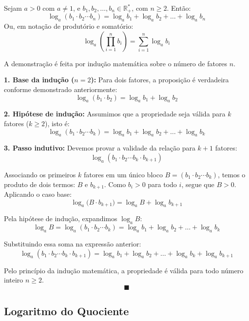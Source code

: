 \documentclass[12pt,a4paper]{report}
\begin{document}
	\newpage
	
	\begin{destaque}
		Sejam $a > 0$ com $a \neq 1$, e $b_1, b_2, \dots, b_n \in \mathbb{R}^*_+$, com $n \geqslant 2$. Então:
		$$\log_a (b_1 \cdot b_2 \dotsm b_n) = \log_a b_1 + \log_a b_2 + \dots + \log_a b_n$$
		Ou, em notação de produtório e somatório:
		$$\log_a \left(\prod_{i=1}^n b_i\right) = \sum_{i=1}^n \log_a b_i$$
	\end{destaque}
	
	\begin{destaque}
		A demonstração é feita por indução matemática sobre o número de fatores $n$.
		
		\textbf{1. Base da indução ($n = 2$):}  
		Para dois fatores, a proposição é verdadeira conforme demonstrado anteriormente:
		$$\log_a (b_1 \cdot b_2) = \log_a b_1 + \log_a b_2$$
		
		\textbf{2. Hipótese de indução:}  
		Assumimos que a propriedade seja válida para $k$ fatores ($k \geqslant 2$), isto é:
		$$\log_a (b_1 \cdot b_2 \dotsm b_k) = \log_a b_1 + \log_a b_2 + \dots + \log_a b_k$$
		
		\textbf{3. Passo indutivo:}  
		Devemos provar a validade da relação para $k + 1$ fatores:
		$$\log_a (b_1 \cdot b_2 \dotsm b_k \cdot b_{k+1})$$
		
		Associando os primeiros $k$ fatores em um único bloco $B = (b_1 \cdot b_2 \dotsm b_k)$, temos o produto de dois termos: $B$ e $b_{k+1}$. Como $b_i > 0$ para todo $i$, segue que $B > 0$. Aplicando o caso base:
		$$\log_a \bigl(B \cdot b_{k+1}\bigr) = \log_a B + \log_a b_{k+1}$$
		
		Pela hipótese de indução, expandimos $\log_a B$:
		$$\log_a B = \log_a (b_1 \cdot b_2 \dotsm b_k) = \log_a b_1 + \log_a b_2 + \dots + \log_a b_k$$
		
		Substituindo essa soma na expressão anterior:
		$$\log_a (b_1 \cdot b_2 \dotsm b_k \cdot b_{k+1}) = \log_a b_1 + \log_a b_2 + \dots + \log_a b_k + \log_a b_{k+1}$$
		
		Pelo princípio da indução matemática, a propriedade é válida para todo número inteiro $n \geqslant 2$.
		$$\blacksquare$$
	\end{destaque}
	
	\subsection{Logaritmo do Quociente}
	
\end{document}
